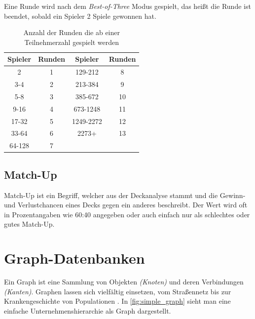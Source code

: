 Eine Runde wird nach dem \emph{Best-of-Three} Modus gespielt, das heißt die Runde ist beendet, sobald ein Spieler 2 Spiele gewonnen hat. 

\begin{table}[h] %
    
    \caption{Anzahl der Runden die ab einer Teilnehmerzahl gespielt werden \cite{wotc:swiss}} 
    
    \myfloatalign
    \begin{tabular}{cc|cc}
        \toprule 
        Spieler & Runden & Spieler & Runden \\ 
        \midrule 
        2      & 1 & 129-212   & 8  \\ 
        3-4    & 2 & 213-384   & 9  \\ 
        5-8    & 3 & 385-672   & 10 \\ 
        9-16   & 4 & 673-1248  & 11 \\ 
        17-32  & 5 & 1249-2272 & 12 \\ 
        33-64  & 6 & 2273+     & 13 \\ 
        64-128 & 7 &           &  \\ 
        \bottomrule 
    \end{tabular}
    \label{tab:swisspairings}
\end{table}

\subsection{Match-Up}
Match-Up ist ein Begriff, welcher aus der Deckanalyse stammt und die Gewinn- und Verlustchancen eines Decks gegen ein anderes beschreibt. Der Wert wird oft in Prozentangaben wie 60:40 angegeben oder auch einfach nur als schlechtes oder gutes Match-Up.

\section{Graph-Datenbanken}
Ein Graph ist eine Sammlung von Objekten \emph{(Knoten)} und deren Verbindungen \emph{(Kanten)}. Graphen lassen sich vielfältig einsetzen, vom Straßennetz bis zur Krankengeschichte von Populationen \cite{robinsongraph:2015}. In \autoref{fig:simple_graph} sieht man eine einfache Unternehmenshierarchie als Graph dargestellt. 

